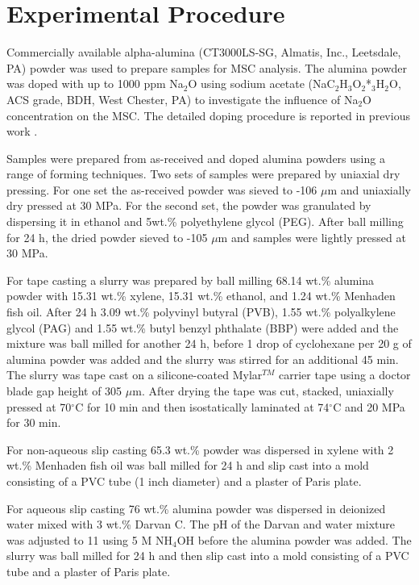 \section{Experimental Procedure}

Commercially available alpha-alumina (CT3000LS-SG, Almatis, Inc., Leetsdale, PA) powder was used to prepare samples for MSC analysis. The alumina powder was doped with up to 1000 ppm Na$_{2}$O using sodium acetate (NaC$_{2}$H$_{3}$O$_{2}$*$_{3}$H$_{2}$O, ACS grade, BDH, West Chester, PA) to investigate the influence of Na$_{2}$O concentration on the MSC. The detailed doping procedure is reported in previous work \cite{Frueh2016}.

Samples were prepared from as-received and doped alumina powders using a range of forming techniques. Two sets of samples were prepared by uniaxial dry pressing. For one set the as-received powder was sieved to -106 $\mu$m and uniaxially dry pressed at 30 MPa. For the second set, the powder was granulated by dispersing it in ethanol and 5wt.\% polyethylene glycol (PEG). After ball milling for 24 h, the dried powder sieved to -105 $\mu$m and samples were lightly pressed at 30 MPa.

For tape casting a slurry was prepared by ball milling 68.14 wt.\% alumina powder with 15.31 wt.\% xylene, 15.31 wt.\% ethanol, and 1.24 wt.\% Menhaden fish oil. After 24 h 3.09 wt.\% polyvinyl butyral (PVB), 1.55 wt.\% polyalkylene glycol (PAG) and 1.55 wt.\% butyl benzyl phthalate (BBP) were added and the mixture was ball milled for another 24 h, before 1 drop of cyclohexane per 20 g of alumina powder was added and the slurry was stirred for an additional 45 min. The slurry was tape cast on a silicone-coated Mylar$^{TM}$ carrier tape using a doctor blade gap height of 305 $\mu$m. After drying the tape was cut, stacked, uniaxially pressed at 70$^{\circ}$C for 10 min and then isostatically laminated at 74$^{\circ}$C and 20 MPa for 30 min.

For non-aqueous slip casting 65.3 wt.\% powder was dispersed in xylene with 2 wt.\% Menhaden fish oil was ball milled for 24 h and slip cast into a mold consisting of a PVC tube (1 inch diameter) and a plaster of Paris plate.

For aqueous slip casting 76 wt.\% alumina powder was dispersed in deionized water mixed with 3 wt.\% Darvan C. The pH of the Darvan and water mixture was adjusted to 11 using 5 M NH$_{4}$OH before the alumina powder was added. The slurry was ball milled for 24 h and then slip cast into a mold consisting of a PVC tube and a plaster of Paris plate.


